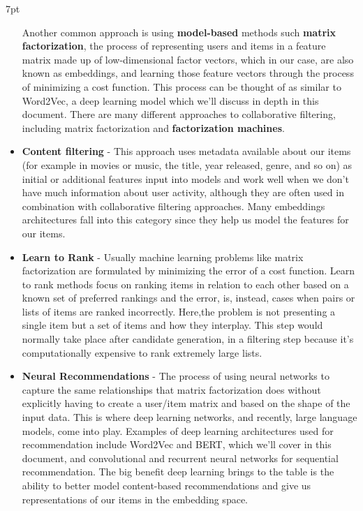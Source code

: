 \documentclass[11pt, table]{diazessay} %
\newenvironment{formal}{%
  \def\FrameCommand{%
    \hspace{1pt}%
    {\color{w_lightblue}\vrule width 2pt}%
    {\color{formalshade}\vrule width 4pt}%
    \colorbox{formalshade}%
  }%
  \MakeFramed{\advance\hsize-\width\FrameRestore}%
  \noindent\hspace{-4.55pt}%
  \begin{adjustwidth}{}{7pt}%
  \vspace{2pt}\vspace{2pt}%
}
{%
  \vspace{2pt}\end{adjustwidth}\endMakeFramed%
}
\begin{document}
\begin{sloppypar}
\begin{formal}
\begin{itemize}
  Another common approach is using \textbf{model-based} methods such  \textbf{matrix factorization}, the process of representing users and items in a feature matrix made up of low-dimensional factor vectors, which in our case, are also known as embeddings, and learning those feature vectors through the process of minimizing a cost function. This process can be thought of as similar to Word2Vec\citep{levy2014neural}, a deep learning model which we'll discuss in depth in this document.  There are many different approaches to collaborative filtering, including matrix factorization and  \textbf{factorization machines}.
   \item \textbf{Content filtering} - This approach uses metadata available about our items (for example in movies or music, the title, year released, genre, and so on) as initial or additional features input into models and work well when we don't have much information about user activity, although they are often used in combination with collaborative filtering approaches. Many embeddings architectures fall into this category since they help us model the features for our items.  
  \item \textbf{Learn to Rank} - Usually machine learning problems like matrix factorization are formulated by minimizing the error of a cost function. Learn to rank methods focus on ranking items in relation to each other based on a known set of preferred rankings and the error, is, instead, cases when pairs or lists of items are ranked incorrectly. Here,the problem is not presenting a single item but a set of items and how they interplay. This step would normally take place after candidate generation, in a filtering step because it's computationally expensive to rank extremely large lists. 
  \item \textbf{Neural Recommendations} - The process of using neural networks to capture the same relationships that matrix factorization does without explicitly having to create a user/item matrix and based on the shape of the input data. This is where deep learning networks, and recently, large language models, come into play. Examples of deep learning architectures used for recommendation include Word2Vec and BERT, which we'll cover in this document, and convolutional and recurrent neural networks for sequential recommendation. The big benefit deep learning brings to the table is the ability to better model content-based recommendations and give us representations of our items in the embedding space.\citep{zhang2019deep}
\end{itemize}
\end{formal}


\end{sloppypar}
\end{document}
